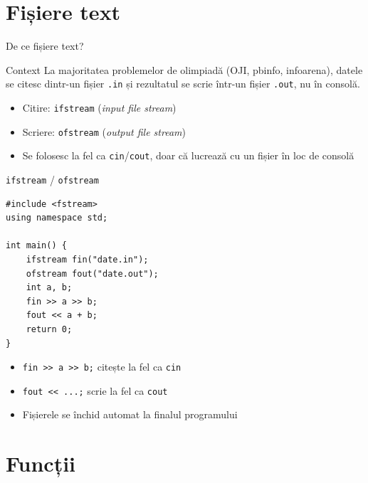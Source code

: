 \documentclass{beamer}
\begin{document}
\section{Fișiere text}

\begin{frame}{De ce fișiere text?}
  \begin{block}{Context}
    La majoritatea problemelor de olimpiadă (OJI, pbinfo, infoarena), datele se citesc dintr-un fișier \texttt{.in} și rezultatul se scrie într-un fișier \texttt{.out}, nu în consolă.
  \end{block}

  \smallskip
  \begin{itemize}
    \item Citire: \texttt{ifstream} (\emph{input file stream})
    \item Scriere: \texttt{ofstream} (\emph{output file stream})
    \item Se folosesc la fel ca \texttt{cin}/\texttt{cout}, doar că lucrează cu un fișier în loc de consolă
  \end{itemize}
\end{frame}

\begin{frame}[fragile]{\texttt{ifstream} / \texttt{ofstream}}
  \begin{lstlisting}
#include <fstream>
using namespace std;

int main() {
    ifstream fin("date.in");
    ofstream fout("date.out");
    int a, b;
    fin >> a >> b;
    fout << a + b;
    return 0;
}
  \end{lstlisting}
  \begin{itemize}
    \item \lstinline|fin >> a >> b;| citește la fel ca \lstinline|cin|
    \item \lstinline|fout << ...;| scrie la fel ca \lstinline|cout|
    \item Fișierele se închid automat la finalul programului
  \end{itemize}
\end{frame}

\section{Funcții}
\end{document}
